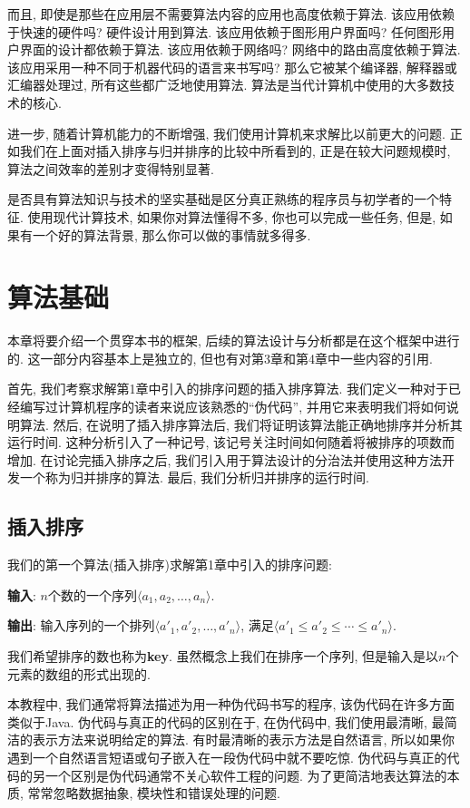 \documentclass[oneside,10pt,fontset=none]{ctexbook}
\begin{document}
而且, 即使是那些在应用层不需要算法内容的应用也高度依赖于算法. 该应用依赖于快速的硬件吗? 硬件设计用到算法. 该应用依赖于图形用户界面吗? 任何图形用户界面的设计都依赖于算法. 该应用依赖于网络吗? 网络中的路由高度依赖于算法. 该应用采用一种不同于机器代码的语言来书写吗? 那么它被某个编译器, 解释器或汇编器处理过, 所有这些都广泛地使用算法. 算法是当代计算机中使用的大多数技术的核心.

进一步, 随着计算机能力的不断增强, 我们使用计算机来求解比以前更大的问题. 正如我们在上面对插入排序与归并排序的比较中所看到的, 正是在较大问题规模时, 算法之间效率的差别才变得特别显著.

是否具有算法知识与技术的坚实基础是区分真正熟练的程序员与初学者的一个特征. 使用现代计算技术, 如果你对算法懂得不多, 你也可以完成一些任务, 但是, 如果有一个好的算法背景, 那么你可以做的事情就多得多.

\chapter{算法基础}

本章将要介绍一个贯穿本书的框架, 后续的算法设计与分析都是在这个框架中进行的. 这一部分内容基本上是独立的, 但也有对第3章和第4章中一些内容的引用.

首先, 我们考察求解第1章中引入的排序问题的插入排序算法. 我们定义一种对于已经编写过计算机程序的读者来说应该熟悉的``伪代码'', 并用它来表明我们将如何说明算法. 然后, 在说明了插入排序算法后, 我们将证明该算法能正确地排序并分析其运行时间. 这种分析引入了一种记号, 该记号关注时间如何随着将被排序的项数而增加. 在讨论完插入排序之后, 我们引入用于算法设计的分治法并使用这种方法开发一个称为归并排序的算法. 最后, 我们分析归并排序的运行时间.

\section{插入排序}

我们的第一个算法(插入排序)求解第1章中引入的排序问题:

\textbf{输入}: $n$个数的一个序列$\langle a_1, a_2, \dots, a_n\rangle$.

\textbf{输出}: 输入序列的一个排列$\langle a'_1, a'_2, \dots, a'_n\rangle$, 满足$\langle a'_1\leq a'_2\leq\cdots\leq a'_n\rangle$.

我们希望排序的数也称为\textbf{key}. 虽然概念上我们在排序一个序列, 但是输入是以$n$个元素的数组的形式出现的.

本教程中, 我们通常将算法描述为用一种伪代码书写的程序, 该伪代码在许多方面类似于Java. 伪代码与真正的代码的区别在于, 在伪代码中, 我们使用最清晰, 最简洁的表示方法来说明给定的算法. 有时最清晰的表示方法是自然语言, 所以如果你遇到一个自然语言短语或句子嵌入在一段伪代码中就不要吃惊. 伪代码与真正的代码的另一个区别是伪代码通常不关心软件工程的问题. 为了更简洁地表达算法的本质, 常常忽略数据抽象, 模块性和错误处理的问题.
\end{document}
